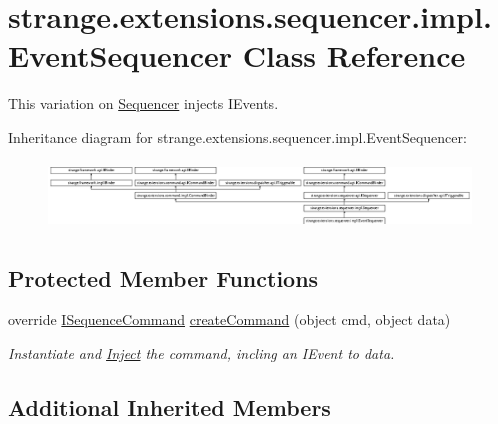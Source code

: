\hypertarget{classstrange_1_1extensions_1_1sequencer_1_1impl_1_1_event_sequencer}{\section{strange.\-extensions.\-sequencer.\-impl.\-Event\-Sequencer Class Reference}
\label{classstrange_1_1extensions_1_1sequencer_1_1impl_1_1_event_sequencer}
}


This variation on \hyperlink{classstrange_1_1extensions_1_1sequencer_1_1impl_1_1_sequencer}{Sequencer} injects I\-Events.  


Inheritance diagram for strange.\-extensions.\-sequencer.\-impl.\-Event\-Sequencer\-:\begin{figure}[H]
\begin{center}
\leavevmode
\includegraphics[height=1.800643cm]{classstrange_1_1extensions_1_1sequencer_1_1impl_1_1_event_sequencer}
\end{center}
\end{figure}
\subsection*{Protected Member Functions}
\begin{DoxyCompactItemize}
\item 
\hypertarget{classstrange_1_1extensions_1_1sequencer_1_1impl_1_1_event_sequencer_aa6014919e77a8fa52f7177a00e38a07c}{override \hyperlink{interfacestrange_1_1extensions_1_1sequencer_1_1api_1_1_i_sequence_command}{I\-Sequence\-Command} \hyperlink{classstrange_1_1extensions_1_1sequencer_1_1impl_1_1_event_sequencer_aa6014919e77a8fa52f7177a00e38a07c}{create\-Command} (object cmd, object data)}\label{classstrange_1_1extensions_1_1sequencer_1_1impl_1_1_event_sequencer_aa6014919e77a8fa52f7177a00e38a07c}

\begin{DoxyCompactList}\small\item\em Instantiate and \hyperlink{class_inject}{Inject} the command, incling an I\-Event to data. \end{DoxyCompactList}\end{DoxyCompactItemize}
\subsection*{Additional Inherited Members}


